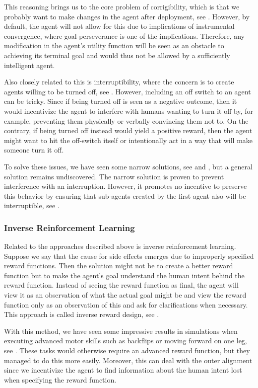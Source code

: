 \documentclass[12pt,A4]{report}
\theoremstyle{definition}
\begin{document}
This reasoning brings us to the core problem of corrigibility, which is that we probably want to make changes in the agent after deployment, see \citet{Corrigibility}. However, by default, the agent will not allow for this due to implications of instrumental convergence, where goal-perseverance is one of the implications. Therefore, any modification in the agent's utility function will be seen as an obstacle to achieving its terminal goal and would thus not be allowed by a sufficiently intelligent agent. 

Also closely related to this is interruptibility, where the concern is to create agents willing to be turned off, see \citet{Interruptible}. However, including an off switch to an agent can be tricky. Since if being turned off is seen as a negative outcome, then it would incentivize the agent to interfere with humans wanting to turn it off by, for example, preventing them physically or verbally convincing them not to. On the contrary, if being turned off instead would yield a positive reward, then the agent might want to hit the off-switch itself or intentionally act in a way that will make someone turn it off. 

To solve these issues, we have seen some narrow solutions, see \citet{Hadfield-Menell} and \citet{Carey}, but a general solution remains undiscovered. The narrow solution is proven to prevent interference with an interruption. However, it promotes no incentive to preserve this behavior by ensuring that sub-agents created by the first agent also will be interruptible, see \citet{co-founding}.  

\subsubsection{Inverse Reinforcement Learning}
Related to the approaches described above is inverse reinforcement learning. Suppose we say that the cause for side effects emerges due to improperly specified reward functions. Then the solution might not be to create a better reward function but to make the agent's goal understand the human intent behind the reward function. Instead of seeing the reward function as final, the agent will view it as an observation of what the actual goal might be and view the reward function only as an observation of this and ask for clarifications when necessary. This approach is called inverse reward design, see \citet{Hadfield-Menell2}.

With this method, we have seen some impressive results in simulations when executing advanced motor skills such as backflips or moving forward on one leg, see \citet{Christiano}. These tasks would otherwise require an advanced reward function, but they managed to do this more easily. Moreover, this can deal with the outer alignment since we incentivize the agent to find information about the human intent lost when specifying the reward function. 
\end{document}
